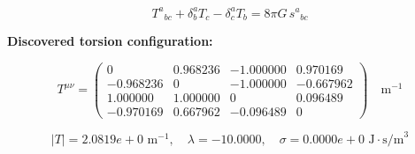
\begin{equation}
  T^a{}_{bc} + \delta^a_b T_c - \delta^a_c T_b = 8\pi G \, s^a{}_{bc}
\end{equation}

\textbf{Discovered torsion configuration:}

\begin{equation}
  T^{\mu\nu} = \begin{pmatrix}
    0 & 0.968236 & -1.000000 & 0.970169 \\
    -0.968236 & 0 & -1.000000 & -0.667962 \\
    1.000000 & 1.000000 & 0 & 0.096489 \\
    -0.970169 & 0.667962 & -0.096489 & 0
  \end{pmatrix} \quad \text{m}^{-1}
\end{equation}

\begin{equation}
  |T| = 2.0819e+0 \text{ m}^{-1}, \quad
  \lambda = -10.0000, \quad
  \sigma = 0.0000e+0 \text{ J}\cdot\text{s/m}^3
\end{equation}
